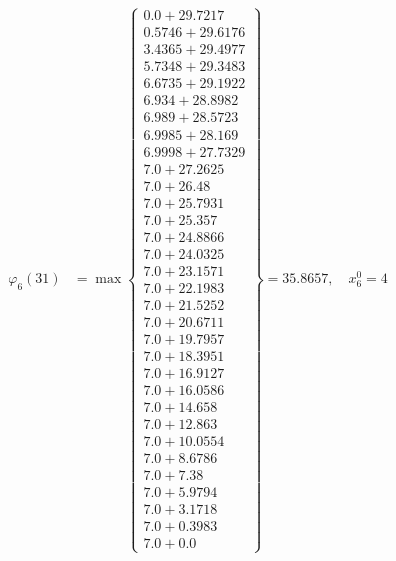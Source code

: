 \documentclass{article}
\begin{document}
\begin{align*}
\varphi_{6}(31) &= \max \left\{ \begin{array}{c}
0.0 + 29.7217 \\
 0.5746 + 29.6176 \\
 3.4365 + 29.4977 \\
 5.7348 + 29.3483 \\
 6.6735 + 29.1922 \\
 6.934 + 28.8982 \\
 6.989 + 28.5723 \\
 6.9985 + 28.169 \\
 6.9998 + 27.7329 \\
 7.0 + 27.2625 \\
 7.0 + 26.48 \\
 7.0 + 25.7931 \\
 7.0 + 25.357 \\
 7.0 + 24.8866 \\
 7.0 + 24.0325 \\
 7.0 + 23.1571 \\
 7.0 + 22.1983 \\
 7.0 + 21.5252 \\
 7.0 + 20.6711 \\
 7.0 + 19.7957 \\
 7.0 + 18.3951 \\
 7.0 + 16.9127 \\
 7.0 + 16.0586 \\
 7.0 + 14.658 \\
 7.0 + 12.863 \\
 7.0 + 10.0554 \\
 7.0 + 8.6786 \\
 7.0 + 7.38 \\
 7.0 + 5.9794 \\
 7.0 + 3.1718 \\
 7.0 + 0.3983 \\
 7.0 + 0.0
\end{array} \right\}=35.8657, \quad x_{6}^0=4\\
  

\end{align*}
\end{document}
